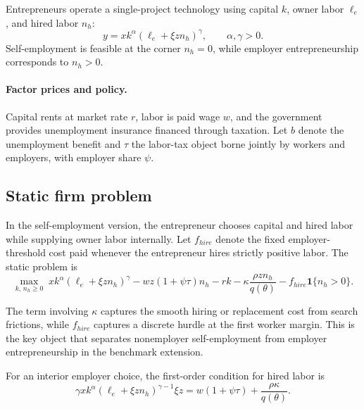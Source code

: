 Entrepreneurs operate a single-project technology using capital $k$, owner
labor $\ell_e$, and hired labor $n_h$:
\begin{equation}
    y = x k^{\alpha} \left( \ell_e + \xi z n_h \right)^{\gamma},
    \qquad \alpha, \gamma > 0.
    \label{eq:model_prod_self_employment}
\end{equation}
Self-employment is feasible at the corner $n_h = 0$, while employer
entrepreneurship corresponds to $n_h > 0$.

\paragraph{Factor prices and policy.}

Capital rents at market rate $r$, labor is paid wage $w$, and the government
provides unemployment insurance financed through taxation. Let $b$ denote the
unemployment benefit and $\tau$ the labor-tax object borne jointly by workers
and employers, with employer share $\psi$.

\subsection{Static firm problem}

In the self-employment version, the entrepreneur chooses capital and hired labor
while supplying owner labor internally. Let $f_{hire}$ denote the fixed
employer-threshold cost paid whenever the entrepreneur hires strictly positive
labor. The static problem is
\begin{equation}
    \max_{k,\, n_h \geq 0}
    \; x k^{\alpha} \left( \ell_e + \xi z n_h \right)^{\gamma}
    - wz(1 + \psi \tau) n_h
    - rk
    - \kappa \frac{\rho z n_h}{q(\theta)}
    - f_{hire}\mathbf{1}\{n_h > 0\}.
    \label{eq:static_firm_problem_self_employment}
\end{equation}

The term involving $\kappa$ captures the smooth hiring or replacement cost from
search frictions, while $f_{hire}$ captures a discrete hurdle at the first
worker margin. This is the key object that separates nonemployer self-employment
from employer entrepreneurship in the benchmark extension.

For an interior employer choice, the first-order condition for hired labor is
\begin{equation}
    \gamma x k^{\alpha}
    \left( \ell_e + \xi z n_h \right)^{\gamma - 1} \xi z
    = w(1 + \psi \tau) + \frac{\rho \kappa}{q(\theta)}.
    \label{eq:foc_hired_labor_self_employment}
\end{equation}


